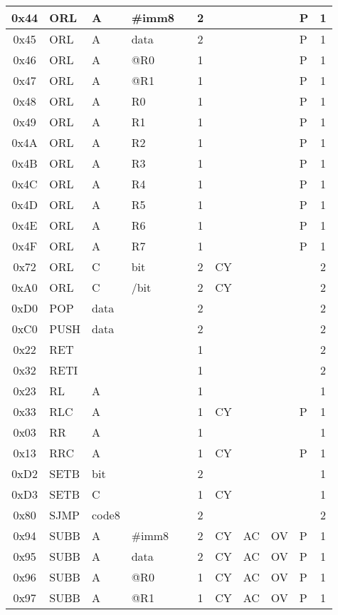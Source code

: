 \documentclass[a4paper,twoside,12pt]{book}
\begin{document}
{\begin{longtable}{|c|l|lll|c|llll|c|}
		0x44	& ORL	& A	& \#imm8&	& 2	&	&	&	& P	& 1	\\\hline
		0x45	& ORL	& A	& data	&	& 2	&	&	&	& P	& 1	\\\hline
		0x46	& ORL	& A	& @R0	&	& 1	&	&	&	& P	& 1	\\\hline
		0x47	& ORL	& A	& @R1	&	& 1	&	&	&	& P	& 1	\\\hline
		0x48	& ORL	& A	& R0	&	& 1	&	&	&	& P	& 1	\\\hline
		0x49	& ORL	& A	& R1	&	& 1	&	&	&	& P	& 1	\\\hline
		0x4A	& ORL	& A	& R2	&	& 1	&	&	&	& P	& 1	\\\hline
		0x4B	& ORL	& A	& R3	&	& 1	&	&	&	& P	& 1	\\\hline
		0x4C	& ORL	& A	& R4	&	& 1	&	&	&	& P	& 1	\\\hline
		0x4D	& ORL	& A	& R5	&	& 1	&	&	&	& P	& 1	\\\hline
		0x4E	& ORL	& A	& R6	&	& 1	&	&	&	& P	& 1	\\\hline
		0x4F	& ORL	& A	& R7	&	& 1	&	&	&	& P	& 1	\\\hline
		0x72	& ORL	& C	& bit	&	& 2	& CY	&	&	&	& 2	\\\hline
		0xA0	& ORL	& C	& /bit	&	& 2	& CY	&	&	&	& 2	\\\hline
		0xD0	& POP	& data	&	&	& 2	&	&	&	&	& 2	\\\hline
		0xC0	& PUSH	& data	&	&	& 2	&	&	&	&	& 2	\\\hline
		0x22	& RET	&	&	&	& 1	&	&	&	&	& 2	\\\hline
		0x32	& RETI	&	&	&	& 1	&	&	&	&	& 2	\\\hline
		0x23	& RL	& A	&	&	& 1	&	&	&	&	& 1	\\\hline
		0x33	& RLC	& A	&	&	& 1	& CY	&	&	& P	& 1	\\\hline
		0x03	& RR	& A	&	&	& 1	&	&	&	&	& 1	\\\hline
		0x13	& RRC	& A	&	&	& 1	& CY	&	&	& P	& 1	\\\hline
		0xD2	& SETB	& bit	&	&	& 2	&	&	&	&	& 1	\\\hline
		0xD3	& SETB	& C	&	&	& 1	& CY	&	&	&	& 1	\\\hline
		0x80	& SJMP	& code8	&	&	& 2	&	&	&	&	& 2	\\\hline
		0x94	& SUBB	& A	& \#imm8&	& 2	& CY	& AC	& OV	& P	& 1	\\\hline
		0x95	& SUBB	& A	& data	&	& 2	& CY	& AC	& OV	& P	& 1	\\\hline
		0x96	& SUBB	& A	& @R0	&	& 1	& CY	& AC	& OV	& P	& 1	\\\hline
		0x97	& SUBB	& A	& @R1	&	& 1	& CY	& AC	& OV	& P	& 1	\\\hline

\end{longtable}}
\end{document}
